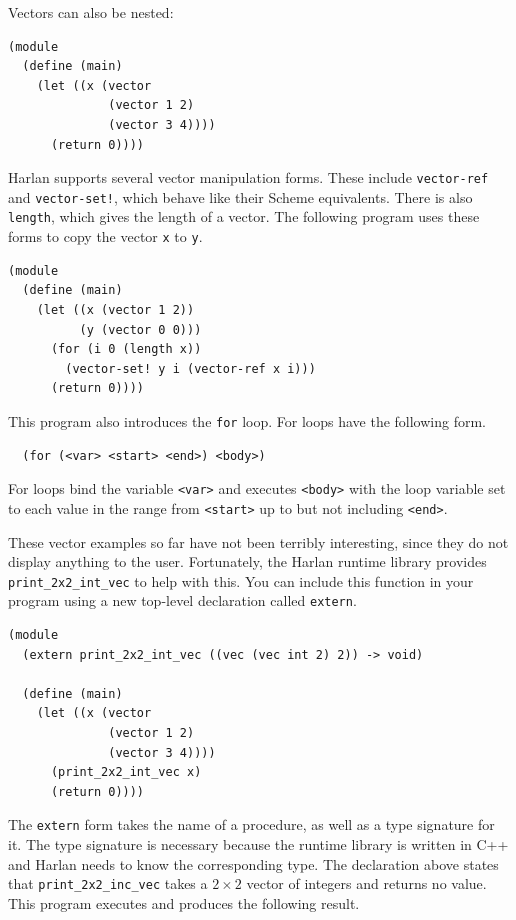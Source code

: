 \documentclass[oneside]{report}
\begin{document}
Vectors can also be nested:

\begin{lstlisting}
(module
  (define (main)
    (let ((x (vector
              (vector 1 2)
              (vector 3 4))))
      (return 0))))
\end{lstlisting}

Harlan supports several vector manipulation forms. These include
\lstinline{vector-ref} and \lstinline{vector-set!}, which behave like
their Scheme equivalents. There is also \lstinline{length}, which
gives the length of a vector. The following program uses these forms
to copy the vector \lstinline{x} to \lstinline{y}.

\begin{lstlisting}
(module
  (define (main)
    (let ((x (vector 1 2))
          (y (vector 0 0)))
      (for (i 0 (length x))
        (vector-set! y i (vector-ref x i)))
      (return 0))))
\end{lstlisting}

This program also introduces the \lstinline{for} loop. For loops have
the following form.

\begin{lstlisting}
  (for (<var> <start> <end>) <body>)
\end{lstlisting}

For loops bind the variable \lstinline{<var>} and executes
\lstinline{<body>} with the loop variable set to each value in the
range from \lstinline{<start>} up to but not including
\lstinline{<end>}.

These vector examples so far have not been terribly interesting, since
they do not display anything to the user. Fortunately, the Harlan
runtime library provides \lstinline{print_2x2_int_vec} to help with
this. You can include this function in your program using a new
top-level declaration called \lstinline{extern}.

\begin{lstlisting}
(module
  (extern print_2x2_int_vec ((vec (vec int 2) 2)) -> void)
  
  (define (main)
    (let ((x (vector
              (vector 1 2)
              (vector 3 4))))
      (print_2x2_int_vec x)
      (return 0))))
\end{lstlisting}

The \lstinline{extern} form takes the name of a procedure, as well as
a type signature for it. The type signature is necessary because the
runtime library is written in C++ and Harlan needs to know the
corresponding type. The declaration above states that
\lstinline{print_2x2_inc_vec} takes a $2 \times 2$ vector of integers
and returns no value. This program executes and produces the following result.
\end{document}
